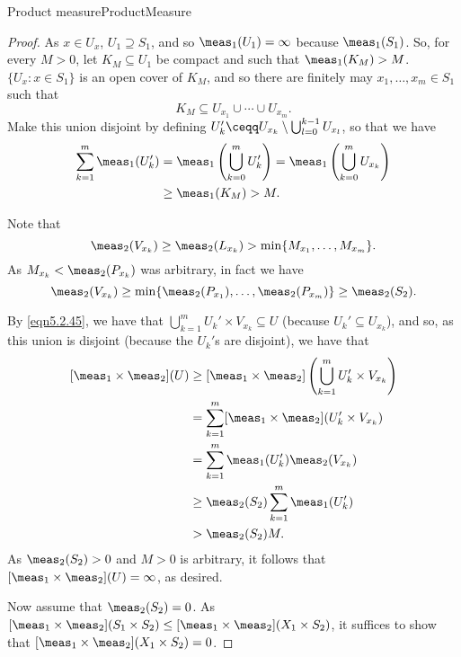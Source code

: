 \begin{thm}{Product measure}{ProductMeasure}
\begin{proof}
As $x\in U_x$, $U_1\supseteq S_1$, and so $\meas _1(U_1)=\infty$ because $\meas _1(S_1)$.  So, for every $M>0$, let $K_M\subseteq U_1$ be compact and such that $\meas _1(K_M)>M$.  $\{ U_x:x\in S_1\}$ is an open cover of $K_M$, and so there are finitely may $x_1,\ldots ,x_m\in S_1$ such that
\begin{equation}
K_M\subseteq U_{x_1}\cup \cdots \cup U_{x_m}.
\end{equation}
Make this union disjoint by defining $U_k'\ceqq U_{x_k}\setminus \bigcup _{l=0}^{k-1}U_{x_l}$, so that we have
\begin{equation}
\begin{split}
\sum _{k=1}^m\meas _1(U_k') & =\meas _1\left( \bigcup _{k=0}^mU_k'\right) =\meas _1\left( \bigcup _{k=0}^mU_{x_k}\right) \\
& \geq \meas _1(K_M)>M.
\end{split}
\end{equation}

Note that
\begin{equation}
\meas _2(V_{x_k})\geq \meas _2(L_{x_k})>\min \{ M_{x_1},\ldots ,M_{x_m}\} .
\end{equation}
As $M_{x_k}<\meas _2(P_{x_k})$ was arbitrary, in fact we have
\begin{equation*}
\meas _2(V_{x_k})\geq \min \{ \meas _2(P_{x_1}),\ldots ,\meas _2(P_{x_m})\} \geq \meas _2(S_2).
\end{equation*}

By \eqref{eqn5.2.45}, we have that $\bigcup _{k=1}^mU_k'\times V_{x_k}\subseteq U$ (because $U_k'\subseteq U_{x_k}$), and so, as this union is disjoint (because the $U_k'$s are disjoint), we have that
\begin{equation}
\begin{split}
[\meas _1\times \meas _2](U) & \geq [\meas _1\times \meas _2]\left( \bigcup _{k=1}^mU_k'\times V_{x_k}\right) \\
& =\sum _{k=1}^m[\meas _1\times \meas _2](U_k'\times V_{x_k}) \\
& =\sum _{k=1}^m\meas _1(U_k')\meas _2(V_{x_k}) \\
& \geq \meas _2(S_2)\sum _{k=1}^m\meas _1(U_k') \\
& >\meas _2(S_2)M.
\end{split}
\end{equation}
As $\meas _2(S_2)>0$ and $M>0$ is arbitrary, it follows that $[\meas _1\times \meas _2](U)=\infty$, as desired.

Now assume that $\meas _2(S_2)=0$.  As $[\meas _1\times \meas _2](S_1\times S_2)\leq [\meas _1\times \meas _2](X_1\times S_2)$, it suffices to show that $[\meas _1\times \meas _2](X_1\times S_2)=0$.


\end{proof}
\end{thm}
